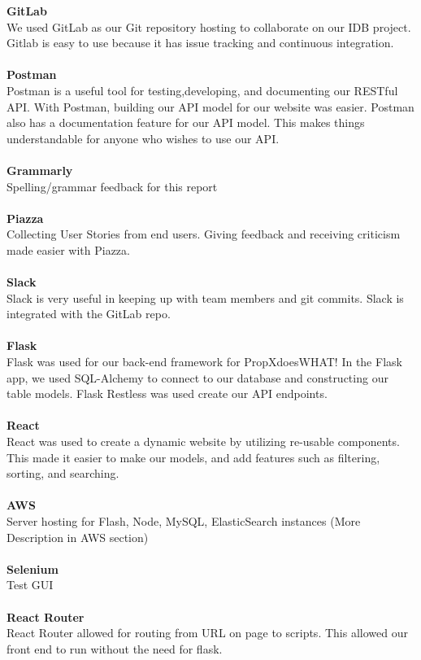 \documentclass[12pt]{article}
\begin{document}
\textbf{GitLab}		\\We used GitLab as our Git repository hosting to collaborate on our IDB project. Gitlab is easy to use because it has issue tracking and continuous integration. \\
\\
\textbf {Postman}		\\Postman is a useful tool for testing,developing, and documenting our RESTful API. With Postman, building our API model for our website was easier. Postman also has a documentation feature for our API model. This makes things understandable for anyone who wishes to use our API.\\ 
\\
\textbf {Grammarly}		\\Spelling/grammar feedback for this report\\
\\
\textbf {Piazza}		\\Collecting User Stories from end users. Giving feedback and receiving criticism made easier with Piazza.\\
\\
\textbf {Slack}			\\Slack is very useful in keeping up with team members and git commits. Slack is integrated with the GitLab repo. \\
\\
\textbf {Flask}     	\\Flask was used for our back-end framework for PropXdoesWHAT! In the Flask app, we used SQL-Alchemy to connect to our database and constructing our table models. Flask Restless was used create our API endpoints.\\
\\
\textbf {React}   	\\React was used to create a dynamic website by utilizing re-usable components. This made it easier to make our models, and add features such as filtering, sorting, and searching.\\
\\
\textbf {AWS}      	\\Server hosting for Flash, Node, MySQL, ElasticSearch instances (More Description in AWS section)\\
\\
\textbf {Selenium} 		\\Test GUI\\
\\
\textbf {React Router} 	\\React Router allowed for routing from URL on page to scripts. This allowed our front end to run without the need for flask.\\
\end{document}
